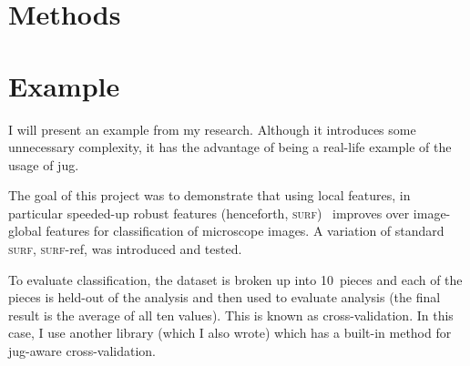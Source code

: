 \documentclass{article}
\begin{document}
\section{Methods}
\section{Example}
I will present an example from my research. Although it introduces some
unnecessary complexity, it has the advantage of being a real-life example of
the usage of jug.

The goal of this project was to demonstrate that using local features, in
particular speeded-up robust features (henceforth,
\textsc{surf})~\cite{surf-paper} improves over image-global features for
classification of microscope images. A variation of standard \textsc{surf},
\textsc{surf}-ref, was introduced and tested.

To evaluate classification, the dataset is broken up into 10~pieces and each of
the pieces is held-out of the analysis and then used to evaluate analysis (the
final result is the average of all ten values). This is known as
cross-validation. In this case, I use another library (which I also wrote)
which has a built-in method for jug-aware cross-validation.
\end{document}
